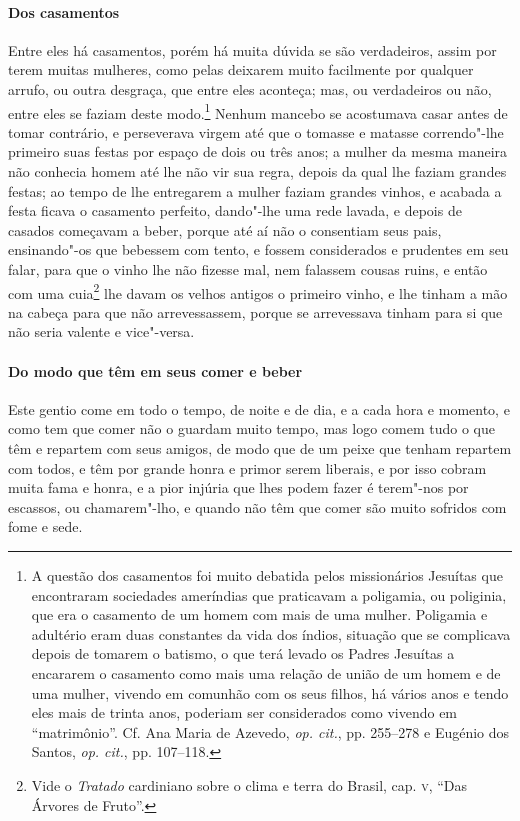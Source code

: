 \begin{linenumbers}
\paragraph{Dos casamentos}\quad
Entre eles há casamentos, porém há muita dúvida se são
verdadeiros, assim por terem muitas mulheres, como pelas deixarem muito
facilmente por qualquer arrufo, ou outra desgraça, que entre eles
aconteça; mas, ou verdadeiros ou não, entre eles se faziam deste 
modo.\footnote{ A questão dos casamentos foi muito debatida pelos
missionários Jesuítas que encontraram sociedades ameríndias que
praticavam a poligamia, ou poliginia, que era o casamento de um homem
com mais de uma mulher. Poligamia e adultério eram duas constantes da
vida dos índios, situação que se complicava depois de tomarem o
batismo, o que terá levado os Padres Jesuítas a encararem o casamento
como mais uma relação de união de um homem e de uma mulher, vivendo em
comunhão com os seus filhos, há vários anos e tendo eles mais de trinta
anos, poderiam ser considerados como vivendo em ``matrimônio''. Cf. Ana
Maria de Azevedo, \textit{op. cit.}, pp. 255--278 e Eugénio dos Santos,
\textit{op. cit.}, pp. 107--118.} Nenhum mancebo se acostumava casar
antes de tomar contrário, e perseverava virgem até que o tomasse e
matasse correndo"-lhe primeiro suas festas por espaço de dois ou três
anos; a mulher da mesma maneira não conhecia homem até lhe não vir sua
regra, depois da qual lhe faziam grandes festas; ao tempo de lhe
entregarem a mulher faziam grandes vinhos, e acabada a festa ficava o
casamento perfeito, dando"-lhe uma rede lavada, e depois de casados
começavam a beber, porque até aí não o consentiam seus pais,
ensinando"-os que bebessem com tento, e fossem considerados e prudentes
em seu falar, para que o vinho lhe não fizesse mal, nem falassem
cousas ruins, e então com uma cuia\footnote{ Vide o \textit{Tratado}
cardiniano sobre o clima e terra do Brasil, cap. \textsc{v}, ``Das Árvores de
Fruto''.} lhe davam os velhos antigos o primeiro vinho, e lhe tinham a
mão na cabeça para que não arrevessassem, porque se arrevessava tinham
para si que não seria valente e vice"-versa. 

\paragraph{Do modo que têm em seus comer e beber}\quad
Este gentio come em todo o tempo, de noite e de dia, e a cada
hora e momento, e como tem que comer não o guardam muito tempo, mas
logo comem tudo o que têm e repartem com seus amigos, de modo que de um
peixe que tenham repartem com todos, e têm por grande honra e primor
serem liberais, e por isso cobram muita fama e honra, e a pior injúria
que lhes podem fazer é terem"-nos por escassos, ou chamarem"-lho, e
quando não têm que comer são muito sofridos com fome e sede.


\end{linenumbers}
